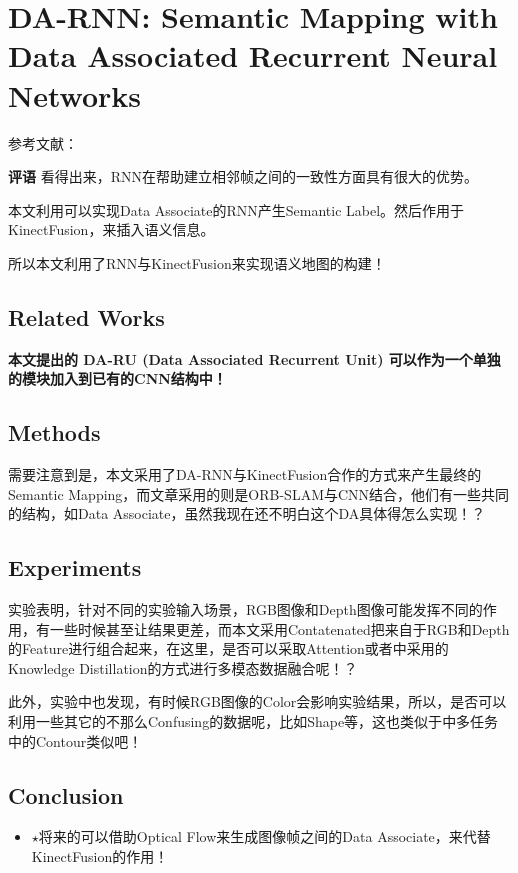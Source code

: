 \section[DA-RNN]{DA-RNN: Semantic Mapping with Data Associated Recurrent Neural Networks}

参考文献：\cite{Xiang2017DARNN}

{\color{red} \textbf{评语} 看得出来，RNN在帮助建立相邻帧之间的一致性方面具有很大的优势。}

本文利用可以实现Data Associate的RNN产生Semantic Label。然后作用于KinectFusion，来插入语义信息。

所以本文利用了RNN与KinectFusion来实现语义地图的构建！

\subsection{Related Works}

{\bfseries 本文提出的 DA-RU (Data Associated Recurrent Unit) 可以作为一个单独的模块加入到已有的CNN结构中！}

\subsection{Methods}

需要注意到是，本文采用了DA-RNN与KinectFusion合作的方式来产生最终的Semantic Mapping，而文章采用的则是ORB-SLAM与CNN结合，他们有一些共同的结构，如Data Associate，虽然我现在还不明白这个DA具体得怎么实现！？

\subsection{Experiments}

实验表明，针对不同的实验输入场景，RGB图像和Depth图像可能发挥不同的作用，有一些时候甚至让结果更差，而本文采用Contatenated把来自于RGB和Depth的Feature进行组合起来，在这里，是否可以采取Attention或者\cite{Xu2018PADNet}中采用的Knowledge Distillation的方式进行多模态数据融合呢！？

此外，实验中也发现，有时候RGB图像的Color会影响实验结果，所以，是否可以利用一些其它的不那么Confusing的数据呢，比如Shape等，这也类似于\cite{Xu2018PADNet}中多任务中的Contour类似吧！


\subsection{Conclusion}

\begin{itemize}
\item $\star$将来的可以借助Optical Flow来生成图像帧之间的Data Associate，来代替KinectFusion的作用！
\end{itemize}

